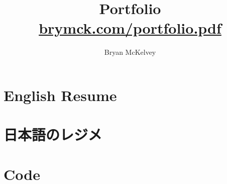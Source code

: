 \documentclass[a4paper,margin,line]{book}
\author{Bryan McKelvey}
\title{
\Huge Portfolio \\
\small\href{http://www.brymck.com/portfolio.pdf}{brymck.com/portfolio.pdf}
}
\begin{document}
\maketitle
\tableofcontents

\chapter{English Resume}


\chapter{日本語のレジメ}


\chapter{Code}

\end{document}

